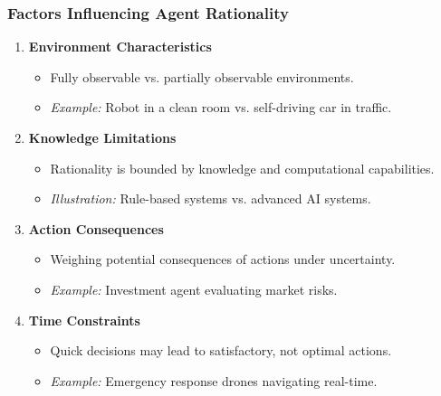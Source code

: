 \documentclass[aspectratio=169]{beamer}
\begin{document}
\begin{frame}[fragile]
    \frametitle{Factors Influencing Agent Rationality}
    \begin{enumerate}
        \item \textbf{Environment Characteristics}
            \begin{itemize}
                \item Fully observable vs. partially observable environments.
                \item \textit{Example:} Robot in a clean room vs. self-driving car in traffic.
            \end{itemize}
        
        \item \textbf{Knowledge Limitations}
            \begin{itemize}
                \item Rationality is bounded by knowledge and computational capabilities.
                \item \textit{Illustration:} Rule-based systems vs. advanced AI systems.
            \end{itemize}
        
        \item \textbf{Action Consequences}
            \begin{itemize}
                \item Weighing potential consequences of actions under uncertainty.
                \item \textit{Example:} Investment agent evaluating market risks.
            \end{itemize}
        
        \item \textbf{Time Constraints}
            \begin{itemize}
                \item Quick decisions may lead to satisfactory, not optimal actions.
                \item \textit{Example:} Emergency response drones navigating real-time.
            \end{itemize}
    \end{enumerate}
\end{frame}
\end{document}
